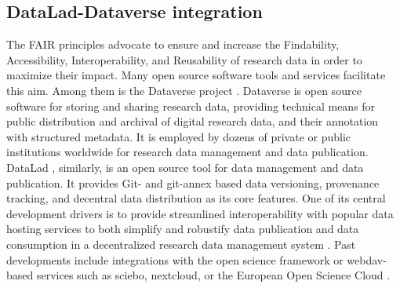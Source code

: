 \documentclass[../main.tex]{subfiles}
\begin{document}
\subsection{DataLad-Dataverse integration}

%

The FAIR principles \parencite{Wilkinson2016} advocate to ensure and increase the Findability, Accessibility, Interoperability, and Reusability of research data in order to maximize their impact. Many open source software tools and services facilitate this aim. Among them is the Dataverse project \parencite{King2007}. Dataverse is open source software for storing and sharing research data, providing technical means for public distribution and archival of digital research data, and their annotation with structured metadata. It is employed by dozens of private or public institutions worldwide for research data management and data publication. DataLad \parencite{Halchenko2021}, similarly, is an open source tool for data management and data publication. It provides Git- and git-annex based data versioning, provenance tracking, and decentral data distribution as its core features. One of its central development drivers is to provide streamlined interoperability with popular data hosting services to both simplify and robustify data publication and data consumption in a decentralized research data management system \parencite{Hanke2021}. Past developments include integrations with the open science framework \parencite{Hanke2020} or webdav-based services such as sciebo, nextcloud, or the European Open Science Cloud \parencite{Halchenko2022}.
\end{document}

